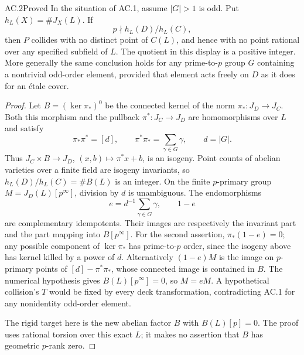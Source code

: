 \begin{claim}{AC.2}{Proved}
In the situation of AC.1, assume $|G|>1$ is odd.  Put
$h_L(X)=\#J_X(L)$.  If
\[
                       p\nmid h_L(D)/h_L(C),
\]
then $P$ collides with no distinct point of $C(L)$, and hence with no
point rational over any specified subfield of $L$.  The quotient in this
display is a positive integer.  More generally the same conclusion holds
for any prime-to-$p$ group $G$ containing a nontrivial odd-order element,
provided that element acts freely on $D$ as it does for an \'etale cover.
\end{claim}
\begin{proof}
Let $B=(\ker\pi_*)^0$ be the connected kernel of the norm
$\pi_*:J_D\to J_C$.  Both this morphism and the pullback
$\pi^*:J_C\to J_D$ are homomorphisms over $L$ and satisfy
\[
 \pi_*\pi^*=[d],\qquad \pi^*\pi_*=\sum_{\gamma\in G}\gamma,
 \qquad d=|G|.
\]
Thus $J_C\times B\to J_D$, $(x,b)\mapsto\pi^*x+b$, is an isogeny.
Point counts of abelian varieties over a finite field are isogeny
invariants, so $h_L(D)/h_L(C)=\#B(L)$ is an integer.  On the finite
$p$-primary group $M=J_D(L)[p^\infty]$, division by $d$ is unambiguous.
The endomorphisms
\[
             e=d^{-1}\sum_{\gamma\in G}\gamma,
             \qquad 1-e
\]
are complementary idempotents.  Their images are respectively the invariant
part and the part mapping into $B[p^\infty]$.  For the second assertion,
$\pi_* (1-e)=0$; any possible component of $\ker\pi_*$ has prime-to-$p$
order, since the isogeny above has kernel killed by a power of $d$.
Alternatively $(1-e)M$ is the image on $p$-primary points of
$[d]-\pi^*\pi_*$, whose connected image is contained in $B$.
The numerical hypothesis gives $B(L)[p^\infty]=0$, so $M=eM$.
A hypothetical collision's $T$ would be fixed by every deck transformation,
contradicting AC.1 for any nonidentity odd-order element.

The rigid target here is the new abelian factor $B$ with
$B(L)[p]=0$.  The proof uses rational torsion over this exact $L$;
it makes no assertion that $B$ has geometric $p$-rank zero.
\end{proof}

